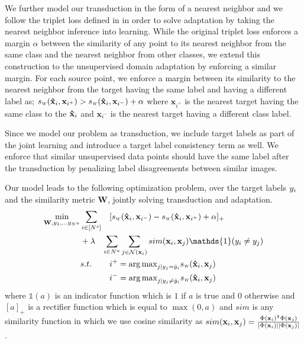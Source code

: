 We further model our transduction in the form of a nearest neighbor and we follow the triplet loss defined in \cite{lmnn} in order to solve adaptation by taking the nearest neighbor inference into learning. While the original triplet loss \cite{lmnn} enforces a margin $\alpha$ between the similarity of any point to its nearest neighbor from the same class and the nearest neighbor from other classes, we extend this construction to the unsupervised domain adaptation by enforcing a similar margin. For each source point, we enforce a margin between its similarity to the nearest neighbor from the target having the same label and having a different label as; $ \sw(\xsi,\mathbf{x}_{i^+}) > \sw(\xsi,\mathbf{x}_{i^-}) + \alpha$ where $\mathbf{x}_{i^+}$ is the nearest target having the same class to the $\mathbf{\hat{x}}_i$ and $\mathbf{x}_{i^-}$ is the nearest target having a different class label.

Since we model our problem as transduction, we include target labels as part of the joint learning and introduce a target label consistency term as well. We enforce that similar unsupervised data points should have the same label after the transduction by penalizing label disagreements between similar images.

Our model leads to the following optimization problem, over the target labels $y_i$ and the similarity metric $\mathbf{W}$, jointly solving transduction and adaptation. 
\begin{equation}
\begin{aligned}
\min_{\mathbf{W}, y_1, \ldots y_{N^u}} &\sum_{i \in [N^s]} &&[\sw(\xsi,\mathbf{x}_{i^-}) - \sw(\xsi,\mathbf{x}_{i^+}) + \alpha]_{+}  \\
&+\lambda &&\hspace{-3mm}\sum_{i \in N^u} \sum_{j \in \mathcal{N}(\xui)}  sim(\xui, \xuj) \mathds{1}(y_i \neq y_j)\\
&s.t. \quad &&i^{+} = {\arg\max}_{j | y_j = \hat{y}_i} \sw(\mathbf{\hat{x}}_i,\mathbf{x}_{j}) \\
&\quad &&i^{-} = {\arg\max}_{j | y_j \neq \hat{y}_i} \sw(\mathbf{\hat{x}}_i,\mathbf{x}_{j}) 
\end{aligned}
\label{loss}
\end{equation}
where $\mathds{1}(a)$ is an indicator function which is $1$ if $a$ is true and $0$ otherwise and $[a]_+$ is a rectifier function which is equal to $\max(0, a)$ and $sim$ is any similarity function in which we use cosine similarity as $sim(\mathbf{x}_i, \mathbf{x}_j)= \frac{\Phi(\mathbf{x}_i)^\intercal \Phi(\mathbf{x}_j)}{|\Phi(\mathbf{x}_i)||\Phi(\mathbf{x}_j)|}$. 

